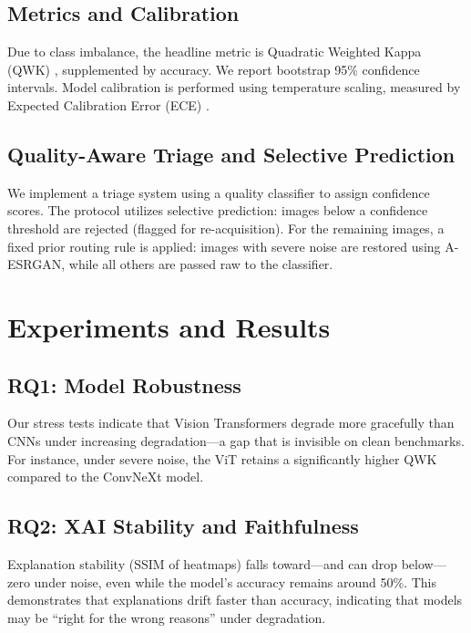 \documentclass[runningheads]{llncs}
\begin{document}
\subsection{Metrics and Calibration}
Due to class imbalance, the headline metric is Quadratic Weighted Kappa (QWK) \cite{cohen1968kappa}, supplemented by accuracy. We report bootstrap 95\% confidence intervals. Model calibration is performed using temperature scaling, measured by Expected Calibration Error (ECE) \cite{guo2017calibration}.

\subsection{Quality-Aware Triage and Selective Prediction}
We implement a triage system using a quality classifier to assign confidence scores. The protocol utilizes selective prediction: images below a confidence threshold are rejected (flagged for re-acquisition). For the remaining images, a fixed prior routing rule is applied: images with severe noise are restored using A-ESRGAN, while all others are passed raw to the classifier.

\section{Experiments and Results}

\subsection{RQ1: Model Robustness}
Our stress tests indicate that Vision Transformers degrade more gracefully than CNNs under increasing degradation---a gap that is invisible on clean benchmarks. For instance, under severe noise, the ViT retains a significantly higher QWK compared to the ConvNeXt model.

\subsection{RQ2: XAI Stability and Faithfulness}
Explanation stability (SSIM of heatmaps) falls toward---and can drop below---zero under noise, even while the model's accuracy remains around 50\%. This demonstrates that explanations drift faster than accuracy, indicating that models may be ``right for the wrong reasons'' under degradation.
\end{document}
